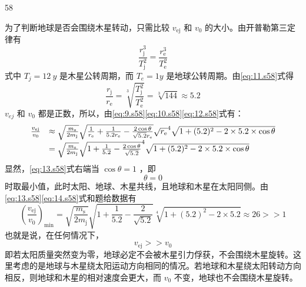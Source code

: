 \begin{solution}{58}
\begin{subsolution}
        为了判断地球是否会围绕木星转动，只需比较 $v_{\mathrm{ej}}$ 和 $v_{0}$ 的大小。由开普勒第三定律有
        \begin{equation}
            \frac {r _ {\mathrm{j}}^{3}}{T _ {\mathrm{j}}^{2}} = \frac {r _ {\mathrm{e}}^{3}}{T _ {\mathrm{e}}^{2}}
            \label{eq:11.s58}
        \end{equation}
        式中 $T_{j}=12\ y$ 是木星公转周期，而 $T_{e}=1y$ 是地球公转周期。由\eqref{eq:11.s58}式得
        \begin{equation}
            \frac {r _ {\mathrm{j}}}{r _ {\mathrm{e}}} = \sqrt[3]{\frac {T _ {\mathrm{j}}^{2}}{T _ {\mathrm{e}}^{2}}} = \sqrt[3]{144} \approx 5.2
            \label{eq:12.s58}
        \end{equation}
        $v_{ej}$ 和 $v_{0}$ 都是正数，所以，由\eqref{eq:9.s58}\eqref{eq:10.s58}\eqref{eq:12.s58}式有：
        \begin{equation}
            \begin{array}{r l}
                \frac {v _ {\mathrm{ej}}}{v _ {0}} & \approx \sqrt {\frac {m _ {\mathrm{s}}}{2 m _ {\mathrm{j}}}} \sqrt {\frac {1}{r _ {\mathrm{e}}} + \frac {1}{5.2 r _ {\mathrm{e}}} - \frac {2 \cos \theta}{\sqrt {5.2} r _ {\mathrm{e}}}} \sqrt{r _ {\mathrm{e}}}^{4} \sqrt {1 + (5.2)^{2} - 2 \times 5.2 \times \cos \theta} \\
                & = \sqrt {\frac {m _ {\mathrm{s}}}{2 m _ {\mathrm{j}}}} \sqrt {1 + \frac {1}{5.2} - \frac {2 \cos \theta}{\sqrt {5.2}}}^{4} \sqrt {1 + (5.2)^{2} - 2 \times 5.2 \times \cos \theta}
            \end{array}
            \label{eq:13.s58}
        \end{equation}
        显然，\eqref{eq:13.s58}式右端当 $\cos \theta = 1$ ，即
        \begin{equation}
            \theta = 0
            \label{eq:14.s58}
        \end{equation}
        时取最小值，此时太阳、地球、木星共线，且地球和木星在太阳同侧。由\eqref{eq:13.s58}\eqref{eq:14.s58}式和题给数据有
        \begin{equation}
            \left(\frac {v _ {\mathrm{ej}}}{v _ {0}}\right)_{\min} = \sqrt {\frac {m _ {\mathrm{s}}}{2 m _ {\mathrm{j}}}} \sqrt {1 + \frac {1}{5.2} - \frac {2}{\sqrt {5.2}}} \sqrt[4]{1 + (5.2)^{2} - 2 \times 5.2} \approx 26 >> 1
            \label{eq:15.s58}
        \end{equation}
        也就是说，在任何情况下，
        \begin{equation}
            v _ {\mathrm{ej}} >> v _ {0}
            \label{eq:16.s58}
        \end{equation}
        即若太阳质量突然变为零，地球必定不会被木星引力俘获，不会围绕木星旋转。这里考虑的是地球与木星绕太阳运动方向相同的情况。若地球和木星绕太阳转动方向相反，则地球和木星的相对速度会更大，而 $v_{0}$ 不变，地球也不会围绕木星旋转。


\end{subsolution}
\end{solution}

